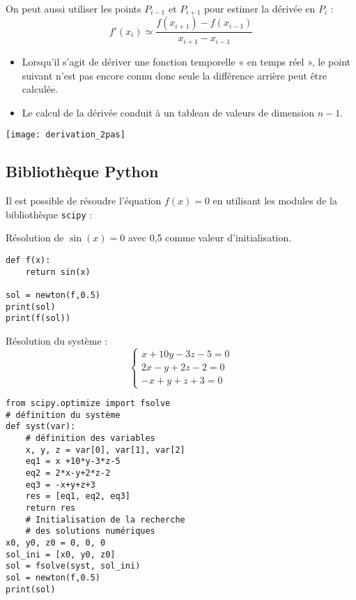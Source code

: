 \begin{minipage}[c]{.6\linewidth}
\begin{resultat}

On peut aussi utiliser les points $P_{i-1}$ et $P_{i+1}$ pour estimer la dérivée en $P_i$ :
$$
f'(x_i)\simeq\dfrac{f(x_{i+1})-f(x_{i-1})}{x_{i+1}-x_{i-1}}
$$

\end{resultat}

\begin{rem}
\begin{itemize}
\item Lorsqu'il s'agit de dériver une fonction temporelle « en temps réel », le point suivant n’est pas encore connu donc seule la différence arrière peut être calculée.
\item Le calcul de la dérivée conduit à un tableau de valeurs de dimension $n-1$.
\end{itemize}
\end{rem}
\end{minipage}\hfill
\begin{minipage}[c]{.35\linewidth}
\begin{center}
\texttt{[image: derivation\_2pas]}
\end{center}
\end{minipage}



\subsection{Bibliothèque Python}
Il est possible de résoudre l'équation $f(x)=0$ en utilisant les modules de la bibliothèque \texttt{scipy} :
\begin{py}
\begin{minipage}[c]{.45\linewidth}
Résolution de $\sin(x)=0$ avec 0,5 comme valeur d'initialisation.
\begin{lstlisting}
def f(x):
    return sin(x)
   
sol = newton(f,0.5)
print(sol)
print(f(sol))
\end{lstlisting}

Résolution du système : 
$$
\left\{\begin{array}{l} 
x+10y-3z-5 = 0 \\ 
2x-y+2z-2 = 0\\
 -x+y+z+3 = 0\end{array}\right.
 $$

\end{minipage}
\hfill
\begin{minipage}[c]{.45\linewidth}
\begin{lstlisting}
from scipy.optimize import fsolve
# définition du système
def syst(var): 
    # définition des variables
    x, y, z = var[0], var[1], var[2] 
    eq1 = x +10*y-3*z-5
    eq2 = 2*x-y+2*z-2
    eq3 = -x+y+z+3
    res = [eq1, eq2, eq3]
    return res
    # Initialisation de la recherche 
    # des solutions numériques
x0, y0, z0 = 0, 0, 0 
sol_ini = [x0, y0, z0]
sol = fsolve(syst, sol_ini)
sol = newton(f,0.5)
print(sol)
\end{lstlisting}
\end{minipage}

\end{py}


